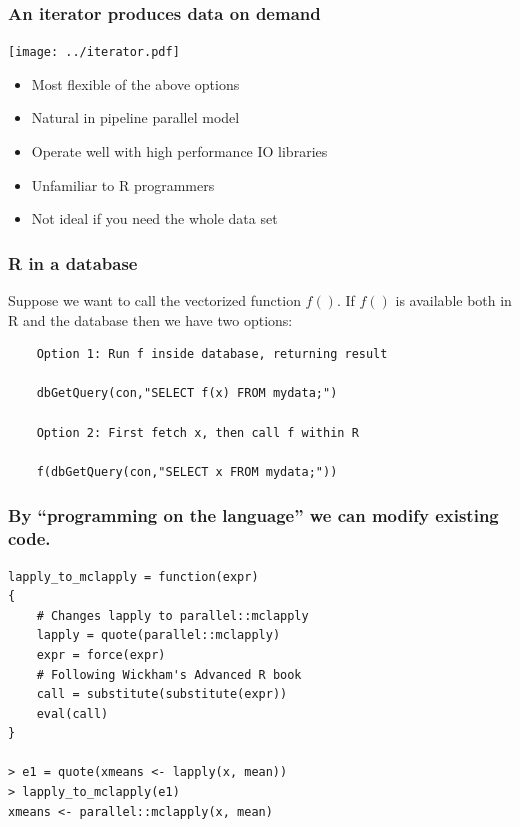 \documentclass{beamer}
\begin{document}
\begin{frame}

    \frametitle{An iterator produces data on demand}

    \centerline{\texttt{[image: ../iterator.pdf]}}

    \begin{itemize}
        \item Most flexible of the above options
        \item Natural in pipeline parallel model
        \item Operate well with high performance IO libraries
    \end{itemize}

    \pause

    \begin{itemize}
        \item Unfamiliar to R programmers
        \item Not ideal if you need the whole data set
    \end{itemize}

\end{frame}
\begin{frame}[fragile]

    \frametitle{R in a database}

    Suppose we want to call the vectorized function $f()$. If $f()$ is
    available both in R and the database then we have two options:

\begin{verbatim}
    Option 1: Run f inside database, returning result
    
    dbGetQuery(con,"SELECT f(x) FROM mydata;")

    Option 2: First fetch x, then call f within R

    f(dbGetQuery(con,"SELECT x FROM mydata;"))
\end{verbatim}

\end{frame}
\begin{frame}[fragile]

    \frametitle{By ``programming on the language'' we can modify existing
    code.}

\begin{verbatim}
lapply_to_mclapply = function(expr)
{
    # Changes lapply to parallel::mclapply
    lapply = quote(parallel::mclapply)
    expr = force(expr)
    # Following Wickham's Advanced R book
    call = substitute(substitute(expr))
    eval(call)
}

> e1 = quote(xmeans <- lapply(x, mean))
> lapply_to_mclapply(e1)
xmeans <- parallel::mclapply(x, mean)
\end{verbatim}

\end{frame}
\end{document}
